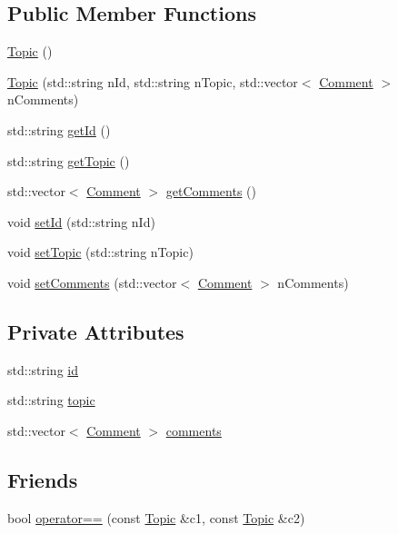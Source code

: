 \subsection*{Public Member Functions}
\begin{DoxyCompactItemize}
\item 
\hyperlink{class_topic_af3301cb0d535eb066a3ea4ed54e28414}{Topic} ()
\item 
\hyperlink{class_topic_a1f896499cd9eddcf5138830364860534}{Topic} (std\+::string n\+Id, std\+::string n\+Topic, std\+::vector$<$ \hyperlink{class_comment}{Comment} $>$ n\+Comments)
\item 
std\+::string \hyperlink{class_topic_a0306b941698e573841540d44de1a908a}{get\+Id} ()
\item 
std\+::string \hyperlink{class_topic_a9f6ad6642112c5f121a92aceb8df9c43}{get\+Topic} ()
\item 
std\+::vector$<$ \hyperlink{class_comment}{Comment} $>$ \hyperlink{class_topic_ac800190b0f4f8ee514255cc75bce1f13}{get\+Comments} ()
\item 
void \hyperlink{class_topic_a11ecfa79333a902a33398ac628280cfa}{set\+Id} (std\+::string n\+Id)
\item 
void \hyperlink{class_topic_a64ecaea143938ef771830f05b703853f}{set\+Topic} (std\+::string n\+Topic)
\item 
void \hyperlink{class_topic_ada5f53077553db0022f528b0328a7437}{set\+Comments} (std\+::vector$<$ \hyperlink{class_comment}{Comment} $>$ n\+Comments)
\end{DoxyCompactItemize}
\subsection*{Private Attributes}
\begin{DoxyCompactItemize}
\item 
std\+::string \hyperlink{class_topic_a3f0e95d8c647b06bd9a3e257d86e021a}{id}
\item 
std\+::string \hyperlink{class_topic_ae74abf3428c3d51f0e3c95e995d29633}{topic}
\item 
std\+::vector$<$ \hyperlink{class_comment}{Comment} $>$ \hyperlink{class_topic_a7302f2cd0169b84d3e4e58af7bc1f73d}{comments}
\end{DoxyCompactItemize}
\subsection*{Friends}
\begin{DoxyCompactItemize}
\item 
bool \hyperlink{class_topic_adc7b3e2ce62c70f0ea7a2dcb1649bd24}{operator==} (const \hyperlink{class_topic}{Topic} \&c1, const \hyperlink{class_topic}{Topic} \&c2)
\end{DoxyCompactItemize}


